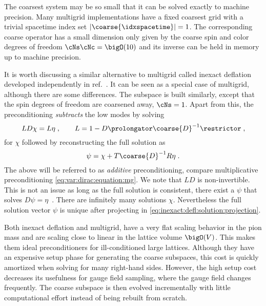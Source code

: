 The coarsest system may be so small that it can be solved exactly to machine precision.
Many multigrid implementations have a fixed coarsest grid with a trivial spacetime index set $\lvert \coarse{\idxspacetime} \rvert = 1$.
The corresponding coarse operator has a small dimension only given by the coarse spin and color degrees of freedom $\cNs \cNc = \bigO(10)$ and its inverse can be held in memory up to machine precision.

It is worth discussing a similar alternative to multigrid called inexact deflation developed independently in ref.~\cite{Luescher2007}.
It can be seen as a special case of multigrid, although there are some differences.
The subspace is built similarly, except that the spin degrees of freedom are coarsened away, $\cNs = 1$.
Apart from this, the preconditioning \emph{subtracts} the low modes by solving
\begin{equation} \label{eq:var:dirac:equation:inexact:defl}
L D \chi = L \eta \;,
\qquad
L = 1 - D \prolongator \coarse{D}^{-1} \restrictor \;,
\end{equation}
for $\chi$ followed by reconstructing the full solution as
\begin{equation} \label{eq:inexact:defl:solution:projection}
\psi = \chi + T \coarse{D}^{-1} R \eta \;.
\end{equation}
The above will be referred to as \emph{additive} preconditioning, compare multiplicative preconditioning \cref{eq:var:dirac:equation:mg}.
We note that $L D$ is non-invertible.
This is not an issue as long as the full solution is consistent, \ie there exist a $\psi$ that solves $D \psi = \eta$~\cite{kaasschieter1988preconditioned}.
There are infinitely many solutions $\chi$.
Nevertheless the full solution vector $\psi$ is unique after projecting in \cref{eq:inexact:defl:solution:projection}.

Both inexact deflation and multigrid, have a very flat scaling behavior in the pion mass and are scaling close to linear in the lattice volume $\bigO(V)$.
This makes them ideal preconditioners for ill-conditioned large lattices.
Although they have an expensive setup phase for generating the coarse subspaces, this cost is quickly amortized when solving for many right-hand sides.
However, the high setup cost decreases its usefulness for gauge field sampling, where the gauge field changes frequently.
The coarse subspace is then evolved incrementally with little computational effort instead of being rebuilt from scratch.

